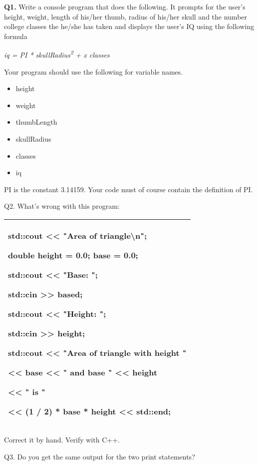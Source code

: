 \documentclass[
]{article}
\providecommand{\tightlist}{%
  \setlength{\itemsep}{0pt}\setlength{\parskip}{0pt}}
\begin{document}
\textbf{Q1.} Write a console program that does the following. It prompts
for the user's height, weight, length of his/her thumb, radius of
his/her skull and the number college classes the he/she has taken and
displays the user's IQ using the following formula

\emph{iq = PI * skullRadius}\textsuperscript{\emph{2 }}\emph{+ x
classes}

Your program should use the following for variable names.

\begin{itemize}
\tightlist
\item
  height
\item
  weight
\item
  thumbLength
\item
  skullRadius
\item
  classes
\item
  iq
\end{itemize}

PI is the constant 3.14159. Your code must of course contain the
definition of PI.

Q2. What's wrong with this program:

\begin{longtable}[]{@{}l@{}}
\toprule
\endhead
\begin{minipage}[t]{0.97\columnwidth}\raggedright
std::cout \textless\textless{} "Area of triangle\textbackslash n";

double height = 0.0; base = 0.0;

std::cout \textless\textless{} "Base: ";

std::cin \textgreater\textgreater{} based;

std::cout \textless\textless{} "Height: ";

std::cin \textgreater\textgreater{} height;

std::cout \textless\textless{} "Area of triangle with height "

\textless\textless{} base \textless\textless{} " and base "
\textless\textless{} height

\textless\textless{} " is "

\textless\textless{} (1 / 2) * base * height \textless\textless{}
std::end;\strut
\end{minipage}\tabularnewline
\bottomrule
\end{longtable}

Correct it by hand. Verify with C++.

Q3. Do you get the same output for the two print statements?
\end{document}
